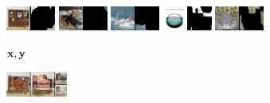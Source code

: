\newcommand{\imagenetimgheight}{0.8cm}
  \begin{figure}[t]
    \centering
    \begin{subfigure}[t]{0.15\textwidth}
      \centering
      \includegraphics[height=\imagenetimgheight]{figs/cigcvae/image-samples/imagenet64/freeform_aipo_0_gt_masked.png}
      \includegraphics[height=\imagenetimgheight]{figs/cigcvae/image-samples/imagenet64/freeform_aipo_1_gt_masked.png}
      \includegraphics[height=\imagenetimgheight]{figs/cigcvae/image-samples/imagenet64/freeform_aipo_2_gt_masked.png}
      \includegraphics[height=\imagenetimgheight]{figs/cigcvae/image-samples/imagenet64/freeform_aipo_3_gt_masked.png}
      \includegraphics[height=\imagenetimgheight]{figs/cigcvae/image-samples/imagenet64/freeform_aipo_4_gt_masked.png}
      \caption{$\mathbf{x}, \mathbf{y}$}
    \end{subfigure}
    \begin{subfigure}[t]{0.2\textwidth}
      \centering
      \includegraphics[height=\imagenetimgheight]{figs/cigcvae/image-samples/imagenet64/freeform_aipo_0_t=0.85_samples.png}

\end{subfigure}
\end{figure}
